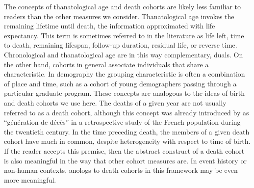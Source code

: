 \documentclass[12pt,oneside,a4paper]{article} %
\theoremstyle{definition}
\begin{document}
The concepts of thanatological age and death cohorts are likely less familiar to
readers than the other measures we consider. Thanatological age invokes the
remaining lifetime until death, the information approximated with life
expectancy. This term is sometimes referred to in the literature as life left,
time to death, remaining lifespan, follow-up duration, residual life, or
reverse time.
Chronological and thanatological age are in this way complementary, duals. On the other hand, cohorts in general associate individuals that share a characteristic. In demography the grouping characteristic is often a combination of place and time, such as a cohort of young demographers passing through a particular graduate program. These concepts are analogous to the ideas of birth and death cohorts we use here. The deaths of a given year are not usually referred to as a death cohort, although this concept was already introduced by \cite{brouard1986} as ``g\'en\'eration de d\'ec\`es'' in a retrospective study of the French population during the twentieth century. In the time preceding death, the members of a given death cohort have much in common, despite heterogeneity with respect to time of birth. If the reader accepts this premise, then the abstract construct of a death cohort is also meaningful in the way that other cohort measures are. In event history or non-human contexts, anologs to death cohorts in this framework may be even more meaningful.
\end{document}

